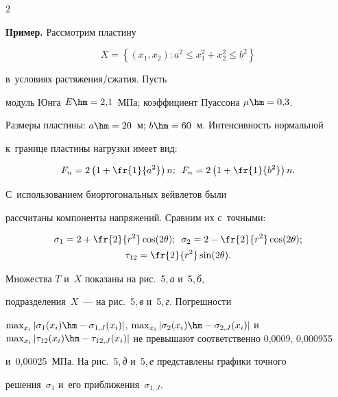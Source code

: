 \begin{multicols}{2}
  \noindent


  \textbf{Пример.} Рассмотрим плас\-ти\-ну 


  $$


  X= \left\{ (x_1, x_2): a^2\leq  x_1^2+ x_2^2\leq b^2\right\}


$$ 


в~условиях рас\-тя\-же\-ния/сжа\-тия. Пусть 


модуль Юнга $E\hm= 2{,}1$~МПа; коэффициент Пуассона $\mu\hm= 0{,}3$. 


Размеры пластины: $a\hm= 20$~м; $b\hm=60$~м. Ин\-тен\-сив\-ность нормальной 


к~границе плас\-ти\-ны нагрузки имеет вид: 


$$


F_n= 2\left(1+ \fr{1}{a^2}\right)n;\enskip F_n=2\left(1+ \fr{1}{b^2}\right)n.


$$


 С~использованием биортогональных вейв\-ле\-тов были 


рассчитаны компоненты на\-пря\-же\-ний. Сравним их с~точными: 


\begin{gather*}


\sigma_1=2+ \fr{2}{r^2}\cos(2\theta);\enskip \sigma_2= 2- \fr{2}{r^2}\cos(2\theta);\\ 


\tau_{12}= \fr{2}{r^2}\sin(2\theta).


\end{gather*}


  


  Множества $T$ и~$X$ показаны на рис.~5,\,\textit{а} и~5,\,\textit{б}, 


подразделения~$X$~--- на рис.~5,\,\textit{в} и~5,\,\textit{г}. Погрешности 


$\max_{x_i}\vert \sigma_1(x_i) \hm- \sigma_{1,J}(x_i)\vert$, $\max_{x_i}\vert 


\sigma_2(x_i)\hm- \sigma_{2,J}(x_i)\vert$ и~$\max_{x_i}\vert \tau_{12}(x_i)\hm- 


\tau_{12,J} (x_i)\vert$ не превышают соответственно 0,0009, 0,000955 


и~0,00025~МПа. На рис.~5,\,\textit{д} и~5,\,\textit{е} пред\-став\-ле\-ны графики точ\-но\-го 


решения~$\sigma_1$  и~его при\-бли\-же\-ния~$\sigma_{1,J}$.


  









\end{multicols}
